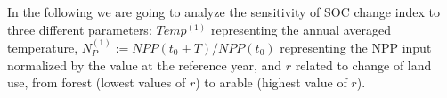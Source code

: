 
\noindent In the following we are going to analyze the sensitivity  of SOC change index to three different parameters: $Temp^{(1)}$ representing the annual averaged temperature, $N_P^{(1)}:=NPP(t_0+T)/NPP(t_0)$ representing the NPP input normalized by the value at the reference year, and $r$ related to change of land use, from forest (lowest values of $r$) to arable (highest value of $r$). 
 
